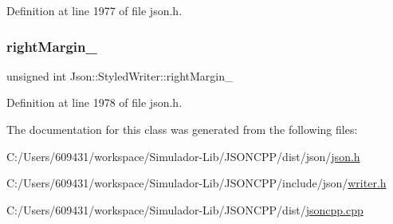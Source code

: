 Definition at line 1977 of file json.\+h.

\hypertarget{class_json_1_1_styled_writer_ae648d2e1fc0f7d45c748c96805106cb0}{}\label{class_json_1_1_styled_writer_ae648d2e1fc0f7d45c748c96805106cb0} 
\subsubsection{\texorpdfstring{right\+Margin\+\_\+}{rightMargin\_}}
{\footnotesize\ttfamily unsigned int Json\+::\+Styled\+Writer\+::right\+Margin\+\_\+\hspace{0.3cm}{\ttfamily [private]}}



Definition at line 1978 of file json.\+h.



The documentation for this class was generated from the following files\+:\begin{DoxyCompactItemize}
\item 
C\+:/\+Users/609431/workspace/\+Simulador-\/\+Lib/\+J\+S\+O\+N\+C\+P\+P/dist/json/\hyperlink{dist_2json_2json_8h}{json.\+h}\item 
C\+:/\+Users/609431/workspace/\+Simulador-\/\+Lib/\+J\+S\+O\+N\+C\+P\+P/include/json/\hyperlink{writer_8h}{writer.\+h}\item 
C\+:/\+Users/609431/workspace/\+Simulador-\/\+Lib/\+J\+S\+O\+N\+C\+P\+P/dist/\hyperlink{jsoncpp_8cpp}{jsoncpp.\+cpp}\end{DoxyCompactItemize}
